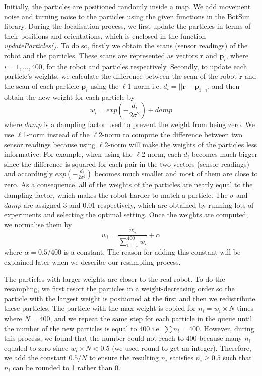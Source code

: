 \documentclass[12pt]{article}
\begin{document}
Initially, the particles are positioned randomly inside a map. We add movement noise and turning noise to the particles using the given functions in the BotSim library. During the localisation process, we first update the particles in terms of their positions and orientations, which is enclosed in the function {\itshape updateParticles()}. To do so, firstly we obtain the scans (sensor readings) of the robot and the particles. These scans are represented as vectors $\mathbf{r}$ and $\mathbf{p}_{i}$, where $i = 1, ..., 400$, for the robot and particles respectively. Secondly, to update each particle's weights, we calculate the difference between the scan of the robot $\mathbf{r}$ and the scan of each particle $\mathbf{p}_{i}$ using the $\ell$1-norm i.e. $d_{i} = ||\mathbf{r} - \mathbf{p_{i}}||_{1}$, and then obtain the new weight for each particle by $$w_{i} = exp(-\frac{d_{i}}{2\sigma^{2}}) + damp$$ where $damp$ is a dampling factor used to prevent the weight from being zero. We use $\ell$1-norm instead of the $\ell$2-norm to compute the difference between two sensor readings because using $\ell$2-norm will make the weights of the particles less informative. For example, when using the $\ell$2-norm, each $d_{i}$ becomes much bigger since the difference is squared for each pair in the two vectors (sensor readings) and accordingly $exp(-\frac{d_{i}}{2\sigma^{2}})$ becomes much smaller and most of them are close to zero. As a consequence, all of the weights of the particles are nearly equal to the dampling factor, which makes the robot harder to match a particle. The $\sigma$ and $damp$ are assigned 3 and 0.01 respectively, which are obtained by running lots of experiments and selecting the optimal setting. Once the weights are computed, we normalise them by  $$w_{i} = \frac{w_{i}}{\sum_{i = 1}^{400}w_{i}} + \alpha$$ where $\alpha = 0.5/400$ is a constant. The reason for adding this constant will be explained later when we describe our resampling process.

The particles with larger weights are closer to the real robot. To do the resampling, we first resort the particles in a weight-decreasing order so the particle with the largest weight is positioned at the first and then we redistribute these particles. The particle with the max weight is copied for $n_{i} = w_{i}\times N$ times where $N=400$, and we repeat the same step for each particle in the queue until the number of the new particles is equal to 400 i.e. $\sum n_{i}=400$. However, during this process, we found that the number could not reach to 400 because many $n_{i}$ equaled to zero since $w_{i}\times N < 0.5$ (we used round to get an integer). Therefore, we add the constant $0.5/N$ to ensure the resulting $n_{i}$ satisfies $n_{i}\ge 0.5$ such that $n_{i}$ can be rounded to 1 rather than 0.
\end{document}
